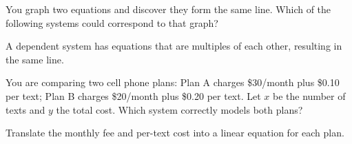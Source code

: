 \documentclass{ximera}
\begin{document}
\begin{problem}
You graph two equations and discover they form the same line. Which of the following systems could correspond to that graph?
\begin{hint}
A dependent system has equations that are multiples of each other, resulting in the same line.
\end{hint}
\begin{multipleChoice}
\end{multipleChoice}
\end{problem}

\begin{problem}
You are comparing two cell phone plans: Plan A charges \$30/month plus \$0.10 per text; Plan B charges \$20/month plus \$0.20 per text. Let $x$ be the number of texts and $y$ the total cost. Which system correctly models both plans?
\begin{hint}
Translate the monthly fee and per-text cost into a linear equation for each plan.
\end{hint}
\begin{multipleChoice}
\end{multipleChoice}
\end{problem}
\end{document}
